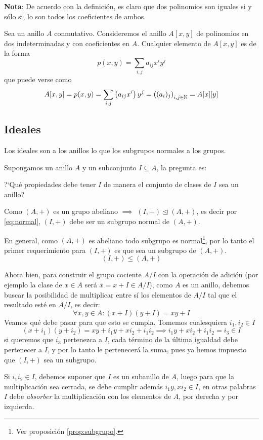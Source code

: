\textbf{Nota}: De acuerdo con la definición, es claro que dos polinomios son iguales si y sólo si, lo son todos los coeficientes de ambos.

\begin{fmd-example}
	Sea un anillo $A$ conmutativo. Consideremos el anillo $A[x, y]$ de polinomios en dos indeterminadas y con coeficientes en $A$. Cualquier elemento de $A[x, y]$ es de la forma \[ p(x, y) = \sum_{i,j} a_{ij} x^i y^j\]
	que puede verse como
	\[ A[x, y] = p(x,y) = \sum_{i,j} \left(a_{ij} x^i\right) y^j = \left( (a_i)_j \right)_{i, j \in \mathbb{N}} = A[x][y] \]
\end{fmd-example}

\subsection{Ideales} \label{sec:ideales}

Los ideales son a los anillos lo que los subgrupos normales a los grupos.

Supongamos un anillo $A$ y un subconjunto $I \subseteq A$, la pregunta es:

?`Qué propiedades debe tener $I$ de manera el conjunto de clases de $I$ sea un anillo?

Como $(A, +)$ es un grupo abeliano $\implies$ $(I, +) \trianglelefteq (A, +)$, es decir por \eqref{eq:normal},  $(I, +)$ debe ser un subgrupo normal de $(A, +)$.

En general, como $(A, +)$ es abeliano todo subgrupo es normal\footnote{Ver proposición \ref{prop:subgrupo}.}, por lo tanto el primer requerimiento para $(I, +)$ es que sea un subgrupo de $(A, +)$.
\[ (I, +) \le (A, +) \]

Ahora bien, para construir el grupo cociente $A/I$ con la operación de adición (por ejemplo la clase de $x \in A$ será $\bar{x} = x + I \in A/I$), como $A$ es un anillo, debemos buscar la posibilidad de multiplicar entre sí los elementos de $A/I$ tal que el resultado esté en $A/I$, es decir:
\[ \forall x, y \in A: (x + I)(y + I) = x y + I \]
Veamos qué debe pasar para que esto se cumpla. Tomemos cualesquiera $i_1, i_2 \in I$
\[ (x + i_1) (y + i_2) = xy + i_1y + xi_2 + i_1i_2 \implies i_1y + xi_2 + i_1i_2 = i_3 \in I\]
si queremos que $i_3$ pertenezca a $I$, cada término de la última igualdad debe pertenecer a $I$, y por lo tanto le pertenecerá la suma, pues ya hemos impuesto que $(I, +)$ sea un subgrupo.

Si $i_1i_2 \in I$, debemos suponer que $I$ es un subanillo de $A$, luego para que la multiplicación sea cerrada, se debe cumplir además $i_1y, xi_2 \in I$, en otras palabras $I$ debe \textit{absorber} la multiplicación con los elementos de $A$, por derecha y por izquierda.

